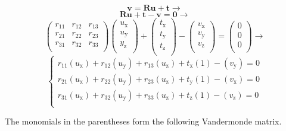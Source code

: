 \begin{equation}
\textbf{v}=\textbf{R}\textbf{u}+\textbf{t} \rightarrow
\end{equation}
\begin{equation}
\textbf{R}\textbf{u}+\textbf{t}-\textbf{v}=\textbf{0} \rightarrow
\end{equation}
\begin{equation}
\begin{pmatrix}
r_{11} & r_{12} & r_{13} \\
r_{21} & r_{22} & r_{23} \\
r_{31} & r_{32} & r_{33} \\
\end{pmatrix}
\begin{pmatrix}
u_\mathrm{x} \\
u_\mathrm{y} \\
y_\mathrm{z} \\
\end{pmatrix}
+
\begin{pmatrix}
t_\mathrm{x} \\
t_\mathrm{y} \\
t_\mathrm{z} \\
\end{pmatrix}
-
\begin{pmatrix}
v_\mathrm{x} \\
v_\mathrm{y} \\
v_\mathrm{z} \\
\end{pmatrix}
=
\begin{pmatrix}
0 \\
0 \\
0 \\
\end{pmatrix}
\rightarrow
\end{equation}
\begin{equation}
\begin{cases}
r_{11} (u_\mathrm{x}) + r_{12} (u_\mathrm{y}) + r_{13} (u_\mathrm{z}) + t_\mathrm{x} (1) - (v_\mathrm{y}) = 0 \\
r_{21} (u_\mathrm{x}) + r_{22} (u_\mathrm{y}) + r_{23} (u_\mathrm{z}) + t_\mathrm{y} (1) - (v_\mathrm{x}) = 0 \\
r_{31} (u_\mathrm{x}) + r_{32} (u_\mathrm{y}) + r_{33} (u_\mathrm{z}) + t_\mathrm{z} (1) - (v_\mathrm{z}) = 0 \\
\end{cases}
\end{equation}

The monomials in the parentheses form the following Vandermonde matrix.

